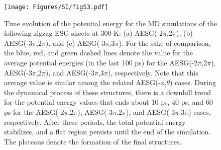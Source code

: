 \documentclass[reprint,superscriptaddress,onecolumn]{revtex4-2}
\begin{document}
\begin{figure}[!h]
\centering
\texttt{[image: Figures/SI/figS3.pdf]}
\caption{Time evolution of the potential energy for the MD simulations of the following zigzag ESG sheets at 300 K: (a) AESG(-2$\pi$,2$\pi$), (b) AESG(-3$\pi$,2$\pi$), and (c) AESG(-3$\pi$,3$\pi$). For the sake of comparison, the blue, red, and green dashed lines denote the value for the average potential energies (in the last 100 ps) for the AESG(-2$\pi$,2$\pi$), AESG(-3$\pi$,2$\pi$), and AESG(-3$\pi$,3$\pi$), respectively. Note that this average value is similar among the related AESG(-$\phi$,$\theta$) cases. During the dynamical process of these structures, there is a downhill trend for the potential energy values that ends about 10 ps, 40 ps, and 60 ps for the AESG(-2$\pi$,2$\pi$), AESG(-3$\pi$,2$\pi$), and AESG(-3$\pi$,3$\pi$) cases, respectively. After these periods, the total potential energy stabilizes, and a flat region persists until the end of the simulation. The plateaus denote the formation of the final structures.}
\label{figs3}
\end{figure}
\end{document}
